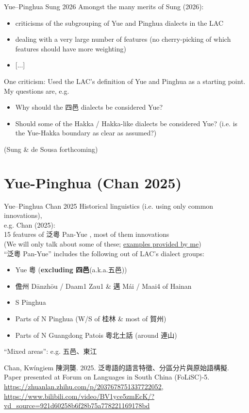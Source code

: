 \documentclass{beamer}
\begin{document}
\begin{frame}[fragile]{Yue–Pinghua \scriptsize{Sung 2026}}
Amongst the many merits of Sung (2026):
\begin{itemize}
    \item criticisms of the subgrouping of Yue and Pinghua dialects in the LAC\\
    \item dealing with a very large number of features (no cherry-picking of which features should have more weighting)\\
    \item {[...]}
\end{itemize}
One criticism: Used the LAC's definition of Yue and Pinghua as a starting point. My questions are, e.g.\\
\begin{itemize}
    \item Why should the 四邑 dialects be considered Yue?\\
    \item Should some of the Hakka / Hakka-like dialects be considered Yue? (i.e. is the Yue-Hakka boundary as clear as assumed?)
\end{itemize}
{\scriptsize(Sung \& de Sousa forthcoming)}\\
\end{frame}

\section{Yue-Pinghua (Chan 2025)}

\begin{frame}[fragile]{Yue–Pinghua \scriptsize{Chan 2025}}
Historical linguistics (i.e. using only common innovations),\\ e.g. Chan (2025):\\ 15 features of 泛粵 Pan-Yue , most of them innovations\\
{\scriptsize (We will only talk about some of these; \underline{examples provided by me})}\\
\medskip
\enquote{泛粵 Pan-Yue} includes the following out of LAC's dialect groups:\\ 
\begin{itemize}
    \item Yue 粵 (\textbf{excluding 四邑}(a.k.a.五邑))
    \item 儋州 Dānzhōu / Daam1 Zau1 \& 邁 Mái / Maai4 of Hainan
    \item S Pinghua
    \item Parts of N Pinghua (W/S of 桂林 \& most of 賀州)
    \item Parts of N Guangdong Patois 粵北土話 (around 連山)
\end{itemize}
\enquote{Mixed areas}: e.g. 五邑、東江
\vfill {} {\tiny Chan, Kwíngiem 陳泂龑. 2025. 泛粵語的語言特徵、分區分片與原始語構擬. Paper presented at Forum on Languages in South China (FoLiSC)-5. \url{https://zhuanlan.zhihu.com/p/2037678751337722052}, 
 \url{https://www.bilibili.com/video/BV1yce5zmEcK/?vd_source=921d60258b6f28b75a778221169178bd}\par}

\end{frame}
\end{document}
